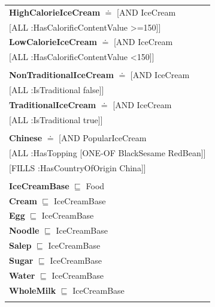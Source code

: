 \documentclass[12pt]{article}
\newcommand*{\MyIndent}{\hspace*{7em}}
\begin{document}
\begin{tabularx}{1\textwidth}{@{}X@{}}
            \textbf{HighCalorieIceCream} $\doteq$ [AND IceCream \\
                                             \MyIndent \MyIndent [ALL :HasCalorificContentValue >=150]] \\
            \textbf{LowCalorieIceCream} $\doteq$ [AND IceCream \\
                                             \MyIndent \MyIndent [ALL :HasCalorificContentValue <150]] \\
                                             \tabularnewline
                                             
            \textbf{NonTraditionalIceCream} $\doteq$ [AND IceCream \\
                                             \MyIndent \MyIndent [ALL :IsTraditional false]] \\
            \textbf{TraditionalIceCream} $\doteq$ [AND IceCream \\
                                             \MyIndent \MyIndent [ALL :IsTraditional true]] \\
                                             \tabularnewline
            
            \textbf{Chinese} $\doteq$ [AND PopularIceCream \\
                                                  \MyIndent [ALL :HasTopping [ONE-OF BlackSesame RedBean]] \\
                                                  \MyIndent [FILLS :HasCountryOfOrigin China]] \\
                                                  \tabularnewline

            
            \textbf{IceCreamBase} $\sqsubseteq$ Food \\
                \textbf{Cream} $\sqsubseteq$ IceCreamBase \\
                \textbf{Egg} $\sqsubseteq$ IceCreamBase \\
                \textbf{Noodle} $\sqsubseteq$ IceCreamBase \\
                \textbf{Salep} $\sqsubseteq$ IceCreamBase \\
                \textbf{Sugar} $\sqsubseteq$ IceCreamBase \\
                \textbf{Water} $\sqsubseteq$ IceCreamBase \\
                \textbf{WholeMilk} $\sqsubseteq$ IceCreamBase \\ \tabularnewline
            

\end{tabularx}
\end{document}
